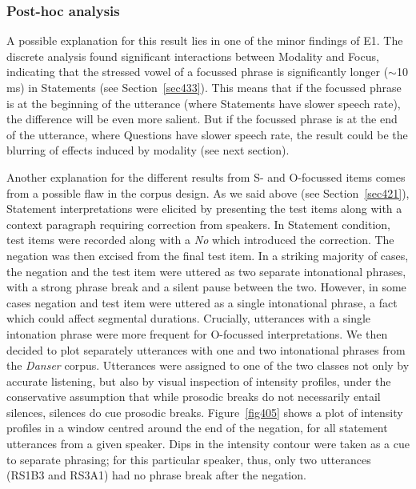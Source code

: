 \subsubsection{Post-hoc analysis}\label{sec4441}
A possible explanation for this result lies in one of the minor findings of E1. The discrete analysis found significant interactions between Modality and Focus, indicating that the stressed vowel of a focussed phrase is significantly longer ($ \sim $10 ms) in Statements (see Section~\ref{sec433}). This means that if the focussed phrase is at the beginning of the utterance (where Statements have slower speech rate), the difference will be even more salient. But if the focussed phrase is at the end of the utterance, where Questions have slower speech rate, the result could be the blurring of effects induced by modality (see next section).

Another explanation for the different results from S- and O-focussed items comes from a possible flaw in the corpus design. As we said above (see Section~\ref{sec421}), Statement interpretations were elicited by presenting the test items along with a context paragraph requiring correction from speakers. In Statement condition, test items were recorded along with a \textit{No} which introduced the correction. The negation was then excised from the final test item. In a striking majority of cases, the negation and the test item were uttered as two separate intonational phrases, with a strong phrase break and a silent pause between the two. However, in some cases negation and test item were uttered as a single intonational phrase, a fact which could affect segmental durations. Crucially, utterances with a single intonation phrase were more frequent for O-focussed interpretations. We then decided to plot separately utterances with one and two intonational phrases from the \textit{Danser} corpus. Utterances were assigned to one of the two classes not only by accurate listening, but also by visual inspection of intensity profiles, under the conservative assumption that while prosodic breaks do not necessarily entail silences, silences do cue prosodic breaks. Figure~\ref{fig405} shows a plot of intensity profiles in a window centred around the end of the negation, for all statement utterances from a given speaker. Dips in the intensity contour were taken as a cue to separate phrasing; for this particular speaker, thus, only two utterances (RS1B3 and RS3A1) had no phrase break after the negation.


